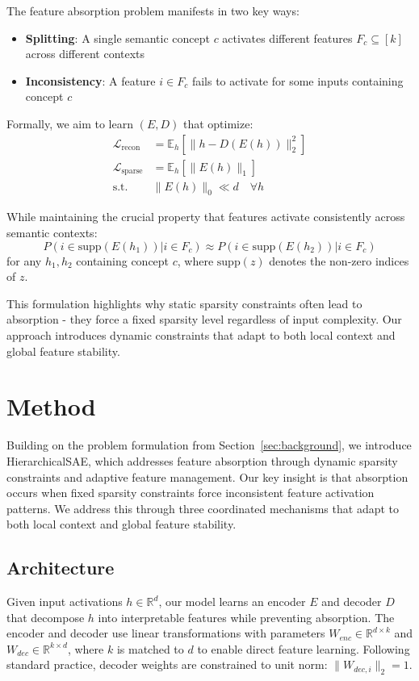 \documentclass{article} %
\begin{document}
The feature absorption problem manifests in two key ways:
\begin{itemize}
    \item \textbf{Splitting}: A single semantic concept $c$ activates different features $F_c \subseteq [k]$ across different contexts
    \item \textbf{Inconsistency}: A feature $i \in F_c$ fails to activate for some inputs containing concept $c$
\end{itemize}

Formally, we aim to learn $(E,D)$ that optimize:
\begin{align*}
    \mathcal{L}_{\text{recon}} &= \mathbb{E}_h[\|h - D(E(h))\|_2^2] \\
    \mathcal{L}_{\text{sparse}} &= \mathbb{E}_h[\|E(h)\|_1] \\
    \text{s.t.} \quad & \|E(h)\|_0 \ll d \quad \forall h
\end{align*}

While maintaining the crucial property that features activate consistently across semantic contexts:
\begin{equation*}
    P(i \in \text{supp}(E(h_1)) | i \in F_c) \approx P(i \in \text{supp}(E(h_2)) | i \in F_c)
\end{equation*}
for any $h_1,h_2$ containing concept $c$, where $\text{supp}(z)$ denotes the non-zero indices of $z$.

This formulation highlights why static sparsity constraints often lead to absorption - they force a fixed sparsity level regardless of input complexity. Our approach introduces dynamic constraints that adapt to both local context and global feature stability.

\section{Method}
\label{sec:method}

Building on the problem formulation from Section~\ref{sec:background}, we introduce HierarchicalSAE, which addresses feature absorption through dynamic sparsity constraints and adaptive feature management. Our key insight is that absorption occurs when fixed sparsity constraints force inconsistent feature activation patterns. We address this through three coordinated mechanisms that adapt to both local context and global feature stability.

\subsection{Architecture}
Given input activations $h \in \mathbb{R}^d$, our model learns an encoder $E$ and decoder $D$ that decompose $h$ into interpretable features while preventing absorption. The encoder and decoder use linear transformations with parameters $W_{enc} \in \mathbb{R}^{d \times k}$ and $W_{dec} \in \mathbb{R}^{k \times d}$, where $k$ is matched to $d$ to enable direct feature learning. Following standard practice, decoder weights are constrained to unit norm: $\|W_{dec,i}\|_2 = 1$.
\end{document}
